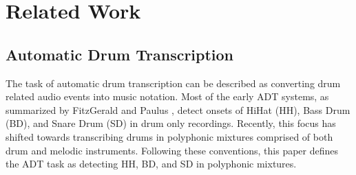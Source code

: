 \documentclass{article}
\newcommand{\comment}[1]{{\textcolor{blue}{#1}}}
\begin{document}


%
\section{Related Work}
\label{sec:relatedwork}
%
\subsection{Automatic Drum Transcription}

The task of automatic drum transcription can be described as converting drum related audio events into music notation. 
Most of the early ADT systems, as summarized by FitzGerald and Paulus \cite{FitzGerald2006}, detect onsets of HiHat (HH), Bass Drum (BD), and Snare Drum (SD) in drum only recordings. 
Recently, this focus has shifted towards transcribing drums in polyphonic mixtures comprised of both drum and melodic instruments. Following these conventions, this paper defines the ADT task as detecting HH, BD, and SD in polyphonic mixtures. 
\end{document}
